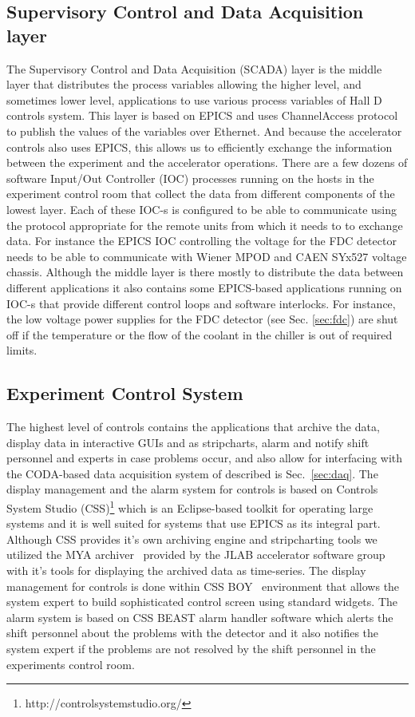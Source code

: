 \subsection{Supervisory Control and Data Acquisition layer \label{sec:archiver}}
The Supervisory Control and Data Acquisition (SCADA) layer is the middle layer that distributes the process variables allowing the higher level, and sometimes lower level, applications to use various process variables of Hall D controls system. This layer is based on EPICS and uses  ChannelAccess protocol to publish the values of the variables over Ethernet. And because the accelerator controls also uses EPICS, this allows us to efficiently exchange the information between the experiment and the accelerator operations. There are a few dozens of software Input/Out Controller (IOC) processes running on the hosts in the experiment control room that collect the data from different components of the lowest layer. Each of these IOC-s is configured to be able to communicate using the protocol appropriate for the remote units from which it needs to to exchange data. For instance the EPICS IOC controlling the voltage for the FDC detector needs to be able to communicate with Wiener MPOD and CAEN SYx527 voltage chassis. Although the middle layer is there mostly to distribute the data between different applications it also contains some EPICS-based applications running on IOC-s that provide different control loops and software interlocks.  For instance, the low voltage power supplies for the FDC detector (see Sec. \ref{sec:fdc}) are shut off if the temperature or the flow of the coolant in the chiller is out of required limits. 
\subsection{Experiment Control System \label{sec:alarms}}
The highest level of controls contains the applications that archive the data, display data in interactive GUIs and as stripcharts, alarm and notify shift personnel and experts in case problems occur, and also allow for interfacing with the CODA-based data acquisition system of \gx{} described is Sec.~\ref{sec:daq}.
The display management and the alarm system for \gx{} controls is based on Controls System Studio (CSS)\footnote{http://controlsystemstudio.org/}  which is an Eclipse-based toolkit for operating large systems and it is well suited for systems that use EPICS as its integral part. Although CSS provides it's own archiving engine and stripcharting tools we utilized the MYA archiver~\cite{Slominski:2009icaleps} provided by the JLAB accelerator software group with it's tools for displaying the archived data as time-series. The display management for \gx{} controls is done within CSS BOY~\cite{Chen:2011icaleps} environment that allows the system expert to build sophisticated control screen using standard widgets. The alarm system is based on CSS BEAST\cite{Kasemir:2009icaleps} alarm handler software which alerts the shift personnel about the problems with the detector and it also notifies the system expert if the problems are not resolved by the shift personnel in the experiments control room. 